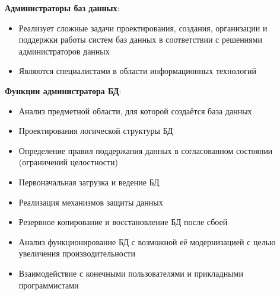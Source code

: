 \documentclass[a4paper]{article}
\begin{document}
\textbf{Администраторы баз данных}:
\begin{itemize}
        \item Реализует сложные задачи проектирования, создания, организации и поддержки работы систем баз данных в соответствии с решениями администраторов данных
	\item Являются специалистами в области информационных технологий
\end{itemize}
\textbf{Функции администратора БД}:
\begin{itemize}
        \item Анализ предметной области, для которой создаётся база данных
	\item Проектирования логической структуры БД
	\item Определение правил поддержания данных в согласованном состоянии (ограничений целостности)
	\item Первоначальная загрузка и ведение БД
	\item Реализация механизмов защиты данных
	\item Резервное копирование и восстановление БД после сбоей
	\item Анализ функционирование БД с возможной её модернизацией с целью увеличения производительности
	\item Взаимодействие с конечными пользователями и прикладными программистами
\end{itemize}
\end{document}
